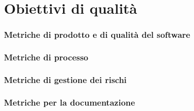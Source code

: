 \section{Obiettivi di qualità}
\subsubsection{Metriche di prodotto e di qualità del software}



\subsubsection{Metriche di processo}


\subsubsection{Metriche di gestione dei rischi}


\subsubsection{Metriche per la documentazione}

